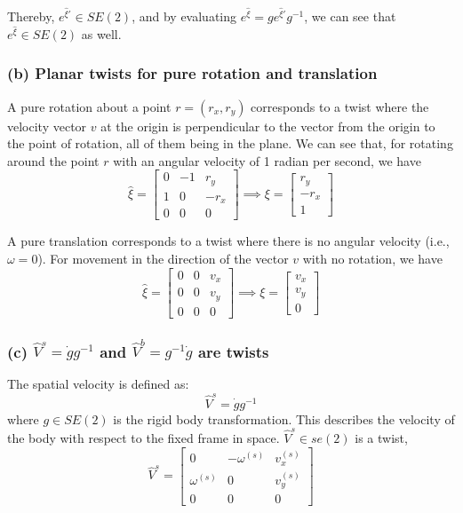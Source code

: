 Thereby, \( e^{\hat \xi'} \in SE(2) \), and by evaluating \( e^{\hat \xi} = g e^{\hat \xi'} g^{-1} \), we can see that \( e^{\hat \xi} \in SE(2) \) as well.

\subsubsection*{(b) Planar twists for pure rotation and translation}

A pure rotation about a point \( r = (r_x, r_y) \) corresponds to a twist where the velocity vector \( v \) at the origin is perpendicular to the vector from the origin to the point of rotation, all of them being in the plane.
We can see that, for rotating around the point \( r \) with an angular velocity of 1 radian per second, we have
\[
    \hat{\xi} = \begin{bmatrix}
        0 & -1 & r_y  \\
        1 & 0  & -r_x \\
        0 & 0  & 0
    \end{bmatrix}
    \implies
    \xi = \begin{bmatrix}
        r_y  \\
        -r_x \\
        1
    \end{bmatrix}
\]

A pure translation corresponds to a twist where there is no angular velocity (i.e., \( \omega = 0 \)).
For movement in the direction of the vector \( v \) with no rotation, we have
\[
    \hat{\xi} = \begin{bmatrix}
        0 & 0 & v_x \\
        0 & 0 & v_y \\
        0 & 0 & 0
    \end{bmatrix}
    \implies
    \xi = \begin{bmatrix}
        v_x \\
        v_y \\
        0
    \end{bmatrix}
\]

\clearpage
\subsubsection*{(c) \( \hat{V}^{s} = \dot{g} g^{-1} \) and \( \hat{V}^{b} = g^{-1} \dot{g} \) are twists}

The spatial velocity is defined as:
\[
    \hat{V}^{s} = \dot{g} g^{-1}
\]
where \( g \in SE(2) \) is the rigid body transformation.
This describes the velocity of the body with respect to the fixed frame in space.
\( \hat{V}^{s} \in se(2) \) is a twist,
\[
    \hat{V}^{s} = \begin{bmatrix}
        0            & -\omega^{(s)} & v_x^{(s)} \\
        \omega^{(s)} & 0             & v_y^{(s)} \\
        0            & 0             & 0
    \end{bmatrix}
\]

